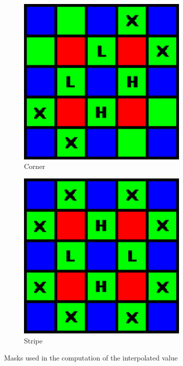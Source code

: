 \documentclass[a4paper,oneside]{article}
\begin{document}
\begin{figure}[htbp]
  \centering
  \begin{subfigure}{0.33\textwidth}
    \centering
    \includegraphics[width=0.9\textwidth]{include_imgs/pri_corner_mask}
    \caption{Corner}
    \label{fig:mask_corner}
  \end{subfigure}%
  \begin{subfigure}{0.33\textwidth}
    \centering
    \includegraphics[width=0.9\textwidth]{include_imgs/pri_stripe_mask}
    \caption{Stripe}
    \label{fig:mask_stripe}
  \end{subfigure}
  \caption{Masks used in the computation of the interpolated value}
\end{figure}
\end{document}
